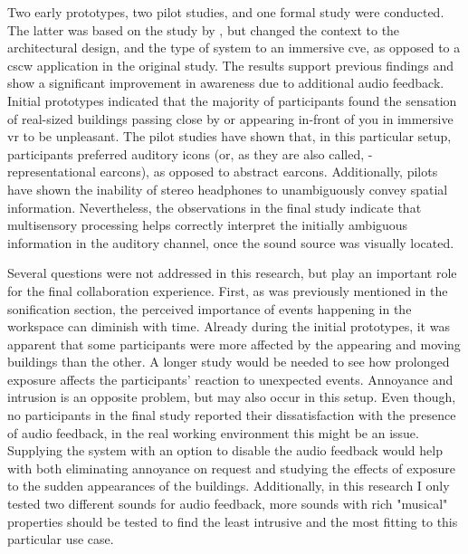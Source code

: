 Two early prototypes, two pilot studies, and one formal study were conducted. The latter was based on the study by \parencite{gutwin_chalk_2011}, but changed the context to the architectural design, and the type of system to an immersive \gls{cve}, as opposed to a \gls{cscw} application in the original study. 
The results support previous findings and show a significant improvement in awareness due to additional audio feedback.
Initial prototypes indicated that the majority of participants found the sensation of real-sized buildings passing close by or appearing in-front of you in immersive \gls{vr} to be unpleasant. The pilot studies have shown that, in this particular setup, participants preferred auditory icons (or, as they are also called, - representational earcons), as opposed to abstract earcons. Additionally, pilots have shown the inability of stereo headphones to unambiguously convey spatial information. Nevertheless, the observations in the final study indicate that multisensory processing helps correctly interpret the initially ambiguous information in the auditory channel, once the sound source was visually located.

Several questions were not addressed in this research, but play an important role for the final collaboration experience. First, as was previously mentioned in the sonification section, the perceived importance of events happening in the workspace can diminish with time. Already during the initial prototypes, it was apparent that some participants were more affected by the appearing and moving buildings than the other. A longer study would be needed to see how prolonged exposure affects the participants' reaction to unexpected events. 
Annoyance and intrusion is an opposite problem, but may also occur in this setup. Even though, no participants in the final study reported their dissatisfaction with the presence of audio feedback, in the real working environment this might be an issue. Supplying the system with an option to disable the audio feedback would help with both eliminating annoyance on request and studying the effects of exposure to the sudden appearances of the buildings. Additionally, in this research I only tested two different sounds for audio feedback, more sounds with rich "musical" properties should be tested to find the least intrusive and the most fitting to this particular use case.

